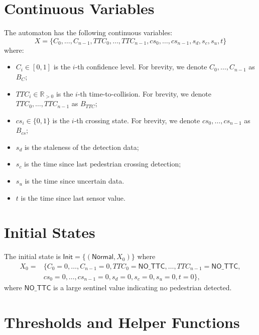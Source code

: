 \documentclass[12pt]{article}
\theoremstyle{definition}
\begin{document}
\section{Continuous Variables}

The automaton has the following continuous variables:
\[X = \{C_0, \ldots, C_{n-1}, TTC_0, \ldots, TTC_{n-1}, cs_0, \ldots, cs_{n-1}, s_d, s_c, s_u, t\}\]
where:
\begin{itemize}
    \item $C_i \in [0,1]$ is the $i$-th confidence level. For brevity, we denote $C_0, \ldots, C_{n-1}$ as $B_C$;
    \item $TTC_i \in \mathbb{R}_{>0}$ is the $i$-th time-to-collision. For brevity, we denote $TTC_0, \ldots, TTC_{n-1}$ as $B_{TTC}$;
    \item $cs_i \in \{0,1\}$ is the $i$-th crossing state. For brevity, we denote $cs_0, \ldots, cs_{n-1}$ as $B_{cs}$;
    \item $s_d$ is the staleness of the detection data;
    \item $s_c$ is the time since last pedestrian crossing detection;
    \item $s_u$ is the time since uncertain data.
    \item $t$ is the time since last sensor value.
\end{itemize}

\section{Initial States}
The initial state is 
\(\mathsf{Init} = \{(\mathsf{Normal}, X_0)\}\)
where 
\[
\begin{aligned}
    X_0 = &\{C_0 = 0, \ldots, C_{n-1} = 0, TTC_0 = \mathsf{NO\_TTC}, \ldots, TTC_{n-1} = \mathsf{NO\_TTC}, \\
            &cs_0 = 0, \ldots, cs_{n-1} = 0, s_d = 0, s_c = 0, s_u = 0, t = 0\},
\end{aligned}
\]
where $\mathsf{NO\_TTC}$ is a large sentinel value indicating no pedestrian detected.


\section{Thresholds and Helper Functions}
\end{document}

